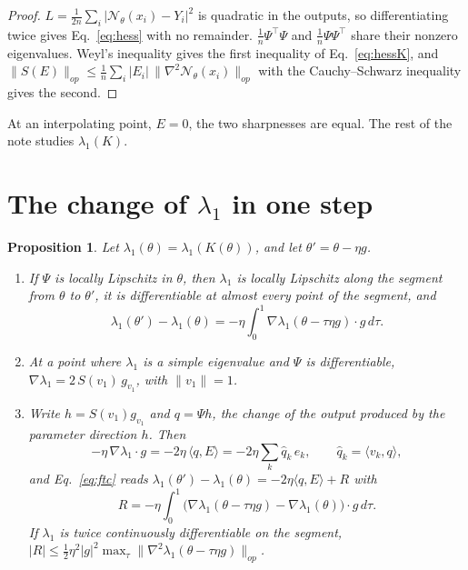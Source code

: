 \documentclass[11pt]{article}
\newtheorem{proposition}{Proposition}
\theoremstyle{definition}
\theoremstyle{remark}
\newcommand{\Net}{\mathcal{N}_\theta}
\newcommand{\ip}[2]{\langle #1,#2\rangle}
\begin{document}
\begin{proof}
$L = \frac1{2n}\sum_i|\Net(x_i) - Y_i|^2$ is quadratic in the outputs, so differentiating twice gives Eq.~\eqref{eq:hess} with no remainder.
$\frac1n\Psi^\top\Psi$ and $\frac1n\Psi\Psi^\top$ share their nonzero eigenvalues.
Weyl's inequality gives the first inequality of Eq.~\eqref{eq:hessK}, and $\|S(E)\|_{op} \le \frac1n\sum_i|E_i|\,\|\nabla^2\Net(x_i)\|_{op}$ with the Cauchy--Schwarz inequality gives the second.
\end{proof}

At an interpolating point, $E = 0$, the two sharpnesses are equal.
The rest of the note studies $\lambda_1(K)$.

\section{The change of $\lambda_1$ in one step}\label{sec:step}

\begin{proposition}\label{prop:step}
Let $\lambda_1(\theta) = \lambda_1(K(\theta))$, and let $\theta' = \theta - \eta g$.
\begin{enumerate}[label=(\alph*)]
\item If $\Psi$ is locally Lipschitz in $\theta$, then $\lambda_1$ is locally Lipschitz along the segment from $\theta$ to $\theta'$, it is differentiable at almost every point of the segment, and
\begin{equation}\label{eq:ftc}
\lambda_1(\theta') - \lambda_1(\theta) = -\eta\int_0^1\nabla\lambda_1(\theta - \tau\eta g)\cdot g\,d\tau .
\end{equation}
\item At a point where $\lambda_1$ is a simple eigenvalue and $\Psi$ is differentiable, $\nabla\lambda_1 = 2\,S(v_1)\,g_{v_1}$, with $\|v_1\| = 1$.
\item Write $h = S(v_1)g_{v_1}$ and $q = \Psi h$, the change of the output produced by the parameter direction $h$. Then
\begin{equation}\label{eq:first}
-\eta\,\nabla\lambda_1\cdot g = -2\eta\,\ip{q}{E} = -2\eta\sum_k \hat q_k\,\hat e_k,\qquad \hat q_k = \ip{v_k}{q},
\end{equation}
and Eq.~\eqref{eq:ftc} reads $\lambda_1(\theta') - \lambda_1(\theta) = -2\eta\ip{q}{E} + R$ with
\begin{equation}\label{eq:rem}
R = -\eta\int_0^1\big(\nabla\lambda_1(\theta - \tau\eta g) - \nabla\lambda_1(\theta)\big)\cdot g\,d\tau .
\end{equation}
If $\lambda_1$ is twice continuously differentiable on the segment, $|R| \le \frac12\eta^2|g|^2\max_{\tau}\|\nabla^2\lambda_1(\theta - \tau\eta g)\|_{op}$.
\end{enumerate}
\end{proposition}
\end{document}
